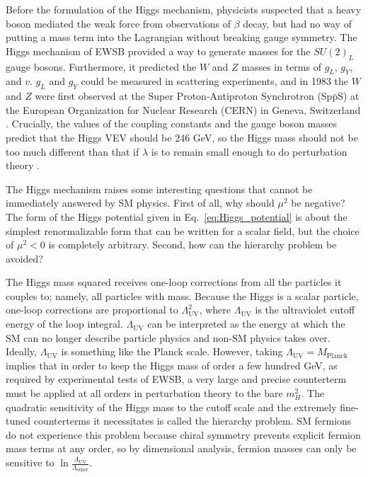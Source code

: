 \documentclass[dissertation.tex]{subfiles}
\begin{document}
Before the formulation of the Higgs mechanism, physicists suspected that a heavy boson mediated the weak force from observations of $\beta$ decay, but had no way of putting a mass term into the Lagrangian without breaking gauge symmetry.  The Higgs mechanism of EWSB provided a way to generate masses for the $SU(2)_{L}$ gauge bosons.  Furthermore, it predicted the $W$ and $Z$ masses in terms of $g_{L}$, $g_{Y}$, and $v$.  $g_{L}$ and $g_{Y}$ could be measured in scattering experiments, and in 1983 the $W$ and $Z$ were first observed at the Super Proton-Antiproton Synchrotron (Sp$\bar{\mbox{p}}$S) at the European Organization for Nuclear Research (CERN) in Geneva, Switzerland \cite{UA1_W, UA1_Z}.  Crucially, the values of the coupling constants and the gauge boson masses predict that the Higgs VEV should be 246 GeV, so the Higgs mass should not be too much different than that if $\lambda$ is to remain small enough to do perturbation theory \cite{Gunion}.

The Higgs mechanism raises some interesting questions that cannot be immediately answered by SM physics.  First of all, why should $\mu^{2}$ be negative?  The form of the Higgs potential given in Eq.~\ref{eq:Higgs_potential} is about the simplest renormalizable form that can be written for a scalar field, but the choice of $\mu^{2} < 0$ is completely arbitrary.  Second, how can the hierarchy problem be avoided?

The Higgs mass squared receives one-loop corrections from all the particles it couples to; namely, all particles with mass.  Because the Higgs is a scalar particle, one-loop corrections are proportional to $\Lambda_{\mathrm{UV}}^{2}$, where $\Lambda_{\mathrm{UV}}$ is the ultraviolet cutoff energy of the loop integral.  $\Lambda_{\mathrm{UV}}$ can be interpreted as the energy at which the SM can no longer describe particle physics and non-SM physics takes over.  Ideally, $\Lambda_{\mathrm{UV}}$ is something like the Planck scale.  However, taking $\Lambda_{\mathrm{UV}} = M_{\mathrm{Planck}}$ implies that in order to keep the Higgs mass of order a few hundred GeV, as required by experimental tests of EWSB, a very large and precise counterterm must be applied at all orders in perturbation theory to the bare $m_{H}^{2}$.  The quadratic sensitivity of the Higgs mass to the cutoff scale and the extremely fine-tuned counterterms it necessitates is called the hierarchy problem.  SM fermions do not experience this problem because chiral symmetry prevents explicit fermion mass terms at any order, so by dimensional analysis, fermion masses can only be sensitive to $\ln\frac{\Lambda_{\mathrm{UV}}}{\Lambda_{\mathrm{other}}}$.
\end{document}
